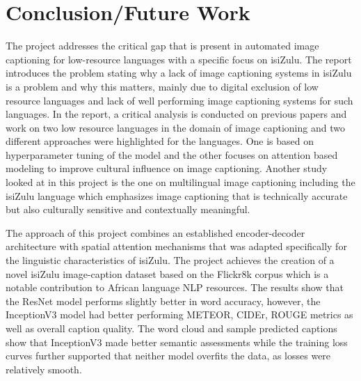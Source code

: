 \documentclass{article}
\begin{document}
\section{Conclusion/Future Work }
The project addresses the critical gap that is present in automated image captioning for low-resource languages with a specific focus on isiZulu. The report introduces the problem stating why a lack of image captioning systems in isiZulu is a problem and why this matters, mainly due to digital exclusion of low resource languages and lack of well performing image captioning systems for such languages. In the report, a critical analysis is conducted on previous papers and work on two low resource languages in the domain of image captioning and two different approaches were highlighted for the languages. One is based on hyperparameter tuning of the model and the other focuses on attention based modeling to improve cultural influence on image captioning. Another study looked at in this project is the one on multilingual image captioning including the isiZulu language which emphasizes image captioning that is technically accurate but also culturally sensitive and contextually meaningful. 

The approach of this project combines an established encoder-decoder architecture with spatial attention mechanisms that was adapted specifically for the linguistic characteristics of isiZulu. The project  achieves the creation of a novel isiZulu image-caption dataset based on the Flickr8k corpus which is a notable contribution to African language NLP resources. The results show that the ResNet model performs slightly better in word accuracy, however, the InceptionV3 model had better performing METEOR, CIDEr, ROUGE metrics as well as overall caption quality. The word cloud and sample predicted captions show that InceptionV3 made better semantic assessments while the training loss curves further supported that neither model overfits the data, as losses were relatively smooth. 

\end{document}
